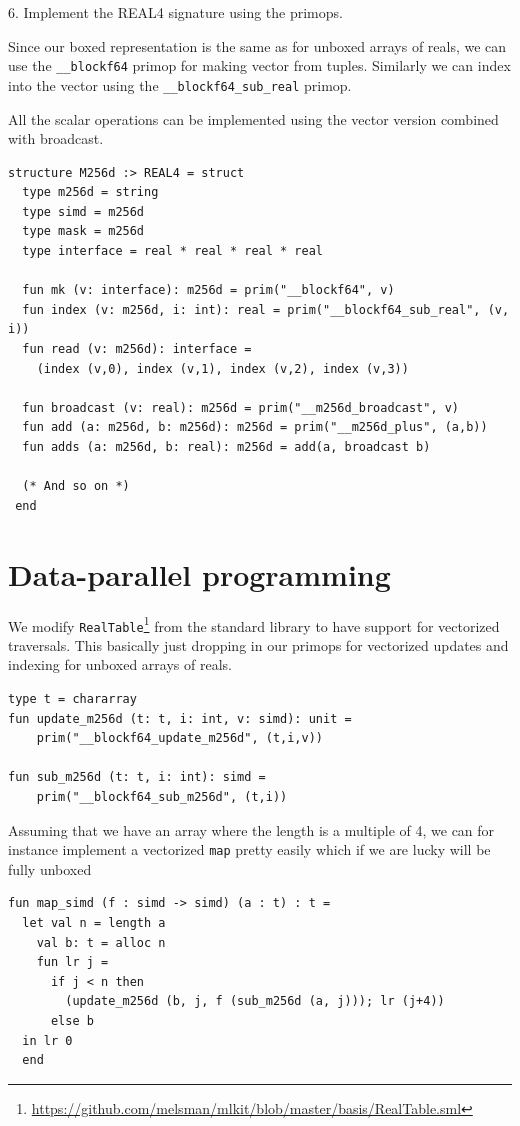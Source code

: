 \documentclass{article}
\begin{document}
6. Implement the REAL4 signature using the primops.

Since our boxed representation is the same as for unboxed arrays of reals, we can use the \verb!__blockf64! primop for making vector from tuples. Similarly we can index into the vector using the \verb!__blockf64_sub_real! primop.

All the scalar operations can be implemented using the vector version combined with broadcast.
\begin{lstlisting}[frame=single]
structure M256d :> REAL4 = struct
  type m256d = string
  type simd = m256d
  type mask = m256d
  type interface = real * real * real * real

  fun mk (v: interface): m256d = prim("__blockf64", v)
  fun index (v: m256d, i: int): real = prim("__blockf64_sub_real", (v, i))
  fun read (v: m256d): interface =
    (index (v,0), index (v,1), index (v,2), index (v,3))

  fun broadcast (v: real): m256d = prim("__m256d_broadcast", v)
  fun add (a: m256d, b: m256d): m256d = prim("__m256d_plus", (a,b))
  fun adds (a: m256d, b: real): m256d = add(a, broadcast b)

  (* And so on *)
 end
\end{lstlisting}

\section{Data-parallel programming}

We modify \texttt{RealTable}\footnote{\url{https://github.com/melsman/mlkit/blob/master/basis/RealTable.sml}} from the standard library to have support for vectorized traversals. This basically just dropping in our primops for vectorized updates and indexing for unboxed arrays of reals.
\begin{lstlisting}[frame=single]
type t = chararray
fun update_m256d (t: t, i: int, v: simd): unit =
    prim("__blockf64_update_m256d", (t,i,v))

fun sub_m256d (t: t, i: int): simd =
    prim("__blockf64_sub_m256d", (t,i))
\end{lstlisting}

Assuming that we have an array where the length is a multiple of 4, we can for instance implement a vectorized \texttt{map} pretty easily which if we are lucky will be fully unboxed
\begin{lstlisting}[frame=single]
fun map_simd (f : simd -> simd) (a : t) : t =
  let val n = length a
    val b: t = alloc n
	fun lr j =
      if j < n then
        (update_m256d (b, j, f (sub_m256d (a, j))); lr (j+4))
      else b
  in lr 0
  end
\end{lstlisting}
\end{document}
